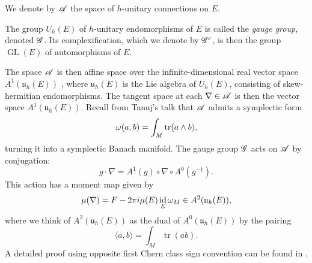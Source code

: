 \documentclass[A4paper, 12pt, british, reqno]{amsart}
\DeclareMathOperator{\id}{id}
\DeclareMathOperator{\tr}{tr}
\DeclareMathOperator{\GL}{GL}
\renewcommand{\u}{\mathfrak{u}}
\begin{document}
\begin{udefn}
    We denote by $\mathscr{A}$ the space of $h$-unitary connections on $E$.
\end{udefn}

\begin{udefn}
    The group $U_{h}(E)$ of $h$-unitary endomorphisms of $E$ is called the \textit{gauge group}, denoted $\mathscr{G}$.
    Its complexification, which we denote by $\mathscr{G}^{c}$, is then the group $\GL(E)$ of automorphisms of $E$.
\end{udefn}

The space $\mathscr{A}$ is then affine space over the infinite-dimensional real vector space $A^{1}(\u_{h}(E))$ \cite[Corollary 4.2.11]{huy05}, where $\u_{h}(E)$ is the Lie algebra of $U_{h}(E)$, consisting of skew-hermitian endomorphisms.
The tangent space at each $\nabla\in \mathscr{A}$ is then the vector space $A^{1}(\u_{h}(E))$.
Recall from Tanuj's talk that $\mathscr{A}$ admits a symplectic form
\[ \w(a,b)=\int_{M}\tr(a\wedge b), \]
turning it into a symplectic Banach manifold.
The gauge group $\mathscr{G}$ acts on $\mathscr{A}$ by conjugation:
\[ g\cdot \nabla=A^{1}(g)\circ \nabla\circ A^{0}(g^{-1}). \]
This action has a moment map given by
\[ \mu(\nabla)=F-2\pi i\mu(E)\id_{E}\w_{M}\in A^{2}(\u_{h}(E)), \]
where we think of $A^{2}(\u_{h}(E))$ as the dual of $A^{0}(\u_{h}(E))$ by the pairing
\[ \langle a,b\rangle=\int_{M}\tr(ab). \]
A detailed proof using opposite first Chern class sign convention can be found in \cite[Proposition II.4.1]{gal19}.





\vfill
\end{document}

